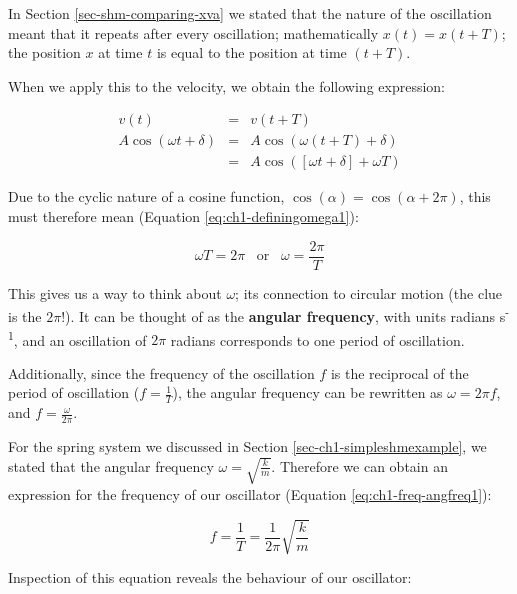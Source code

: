 \documentclass[
]{book}
\begin{document}
In Section \ref{sec-shm-comparing-xva} we stated that the nature of the oscillation meant that it repeats after every oscillation; mathematically \(x(t) = x(t + T)\); the position \(x\) at time \(t\) is equal to the position at time \((t+T)\).

When we apply this to the velocity, we obtain the following expression:

\begin{equation}
\begin{array}{rcl}
v(t) &=& v(t+T) \\
A \cos (\omega t + \delta) &=& A \cos (\omega (t+T) + \delta) \\
&=& A \cos ([\omega t + \delta] + \omega T)
\end{array}
\end{equation}

Due to the cyclic nature of a cosine function, \(\cos (\alpha) = \cos (\alpha + 2\pi)\), this must therefore mean (Equation \eqref{eq:ch1-definingomega1}):

\begin{equation}
\omega T = 2\pi \hspace{10pt} \textrm{or} \hspace{10pt} \omega = \frac{2\pi}{T}
\label{eq:ch1-definingomega1}
\end{equation}

This gives us a way to think about \(\omega\); its connection to circular motion (the clue is the \(2\pi\)!). It can be thought of as the \textbf{angular frequency}, with units radians s\textsuperscript{-1}, and an oscillation of \(2\pi\) radians corresponds to one period of oscillation.

Additionally, since the frequency of the oscillation \(f\) is the reciprocal of the period of oscillation (\(f = \frac{1}{T}\)), the angular frequency can be rewritten as \(\omega = 2\pi f\), and \(f = \frac{\omega}{2\pi}\).

For the spring system we discussed in Section \ref{sec-ch1-simpleshmexample}, we stated that the angular frequency \(\omega = \sqrt{\frac{k}{m}}\). Therefore we can obtain an expression for the frequency of our oscillator (Equation \eqref{eq:ch1-freq-angfreq1}):

\begin{equation}
f = \frac{1}{T} = \frac{1}{2\pi}\sqrt{\frac{k}{m}}
\label{eq:ch1-freq-angfreq1}
\end{equation}

Inspection of this equation reveals the behaviour of our oscillator:
\end{document}
